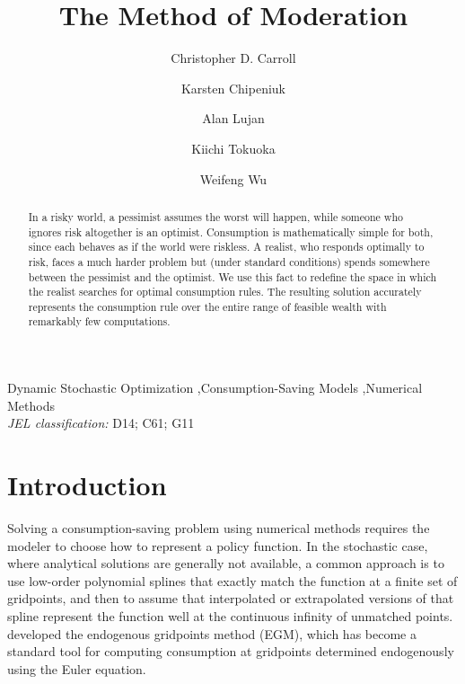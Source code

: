 \documentclass[preprint,authoryear]{elsarticle}
\begin{document}
\begin{frontmatter}

\title{The Method of Moderation}

\author[1,2]{Christopher D. Carroll}\author[3]{Karsten Chipeniuk}\author[1,2]{Alan Lujan}\author[4]{Kiichi Tokuoka}\author[5]{Weifeng Wu}


\begin{abstract}
In a risky world, a pessimist assumes the worst will happen, while someone who ignores risk altogether is an optimist. Consumption is mathematically simple for both, since each behaves as if the world were riskless. A realist, who responds optimally to risk, faces a much harder problem but (under standard conditions) spends somewhere between the pessimist and the optimist. We use this fact to redefine the space in which the realist searches for optimal consumption rules. The resulting solution accurately represents the consumption rule over the entire range of feasible wealth with remarkably few computations.
\end{abstract}

\begin{keyword}
Dynamic Stochastic Optimization \sep Consumption-Saving Models \sep Numerical Methods \\ \textit{JEL classification:} D14; C61; G11\end{keyword}

\end{frontmatter}

\section{Introduction}

Solving a consumption-saving problem using numerical methods requires the modeler to choose how to represent a policy function. In the stochastic case, where analytical solutions are generally not available, a common approach is to use low-order polynomial splines that exactly match the function at a finite set of gridpoints, and then to assume that interpolated or extrapolated versions of that spline represent the function well at the continuous infinity of unmatched points. \citet{carrollEGM} developed the endogenous gridpoints method (EGM), which has become a standard tool for computing consumption at gridpoints determined endogenously using the Euler equation.
\end{document}
